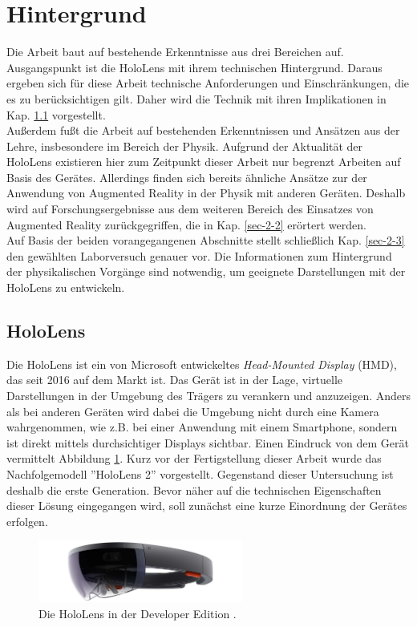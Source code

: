 \section{Hintergrund}
\label{sec-2}
Die Arbeit baut auf bestehende Erkenntnisse aus drei Bereichen auf. Ausgangspunkt ist die HoloLens mit ihrem technischen Hintergrund. Daraus ergeben sich für diese Arbeit technische Anforderungen und Einschränkungen, die es zu berücksichtigen gilt. Daher wird die Technik mit ihren Implikationen in Kap. \ref{sec-2-1} vorgestellt.\\

Außerdem fußt die Arbeit auf bestehenden Erkenntnissen und Ansätzen aus der Lehre, insbesondere im Bereich der Physik. Aufgrund der Aktualität der HoloLens existieren hier zum Zeitpunkt dieser Arbeit nur begrenzt Arbeiten auf Basis des Gerätes. Allerdings finden sich bereits ähnliche Ansätze zur der Anwendung von Augmented Reality in der Physik mit anderen Geräten. Deshalb wird auf Forschungsergebnisse aus dem weiteren Bereich des Einsatzes von Augmented Reality zurückgegriffen, die in Kap. \ref{sec-2-2} erörtert werden.\\

Auf Basis der beiden vorangegangenen Abschnitte stellt schließlich Kap. \ref{sec-2-3} den gewählten Laborversuch genauer vor. Die Informationen zum Hintergrund der physikalischen Vorgänge sind notwendig, um geeignete Darstellungen mit der HoloLens zu entwickeln. 

\subsection{HoloLens}
\label{sec-2-1}
Die HoloLens ist ein von Microsoft entwickeltes \textit{Head-Mounted Display} (HMD), das seit 2016 auf dem Markt ist. Das Gerät ist in der Lage, virtuelle Darstellungen in der Umgebung des Trägers zu verankern und anzuzeigen. Anders als bei anderen Geräten wird dabei die Umgebung nicht durch eine Kamera wahrgenommen, wie z.B. bei einer Anwendung mit einem Smartphone, sondern ist direkt mittels durchsichtiger Displays sichtbar. Einen Eindruck von dem Gerät vermittelt Abbildung \ref{img:hololens}. Kurz vor der Fertigstellung dieser Arbeit wurde das Nachfolgemodell ''HoloLens 2'' vorgestellt. Gegenstand dieser Untersuchung ist deshalb die erste Generation. Bevor näher auf die technischen Eigenschaften dieser Lösung eingegangen wird, soll zunächst eine kurze Einordnung der Gerätes erfolgen.

\begin{figure}[h!]
	\centering
	\includegraphics[width=0.6\textwidth]{images/papers/hololens.jpg}
	\caption{Die HoloLens in der Developer Edition \cite{MRDoc}.}
	\label{img:hololens}
\end{figure}

